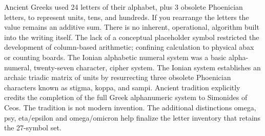 Ancient Greeks used 24 letters of their alphabet, plus 3 obsolete Phoenician letters, to represent units, tens, and hundreds. If you rearrange the letters the value remains an additive sum. There is no inherent, operational, algorithm built into the writing itself. The lack of a conceptual placeholder symbol restricted the development of column-based arithmetic; confining calculation to physical abax or counting boards. The Ionian alphabetic numeral system was a basic alpha-numeral, twenty-seven character, cipher system. The Ionian system establishes an archaic triadic matrix of units by resurrecting three obsolete Phoenician characters known as stigma, koppa, and sampi. Ancient tradition explicitly credits the completion of the full Greek alphanumeric system to Simonides of Ceos. The tradition is not modern invention. The additional distinctions omega, psy, eta/epsilon and omega/omicron help finalize the letter inventory that retains the 27-symbol set. 

